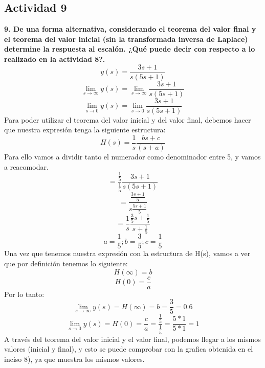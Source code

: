 \subsection{Actividad 9}
\noindent\textbf{9. De una forma alternativa, considerando el teorema del valor final y el teorema del valor inicial (sin la transformada inversa de Laplace) determine la respuesta al escalón. ¿Qué puede decir con respecto a lo realizado en la actividad 8?.}
\[
y(s)=\frac{3s+1}{s(5s+1)}
\]
\[
\lim_{s \to \infty}y(s)=\lim_{s \to \infty}\frac{3s+1}{s(5s+1)}
\]
\[
\lim_{s \to 0}y(s)=\lim_{s \to 0}\frac{3s+1}{s(5s+1)}
\]
Para poder utilizar el teorema del valor inicial y del valor final, debemos hacer que nuestra expresión tenga la siguiente estructura:
\[
H(s)=\frac{1}{s}\frac{bs+c}{(s+a)}
\]
Para ello vamos a dividir tanto el numerador como denominador entre 5, y vamos a reacomodar.
\[
=\frac{\frac{1}{5}}{\frac{1}{5}}\frac{3s+1}{s(5s+1)}
\]
\[
=\frac{\frac{3s+1}{5}}{s{\frac{5s+1}{5}}}
\]
\[
=\frac{1}{s}\frac{\frac{3}{5}s+\frac{1}{5}}{s+\frac{1}{5}}
\]
\[
a=\frac{1}{5};b=\frac{3}{5};c=\frac{1}{5}
\]
Una vez que tenemos nuestra  expresión con la estructura de H(s), vamos a ver que por definición tenemos lo siguiente:
\[
H(\infty)=b
\]
\[
H(0)=\frac{c}{a}
\]
Por lo tanto:
\[
\lim_{s \to \infty}y(s)=H(\infty)=b=\frac{3}{5}=0.6
\]
\[
\lim_{s \to 0}y(s)=H(0)=\frac{c}{a}=\frac{\frac{1}{5}}{\frac{1}{5}}=
\frac{5*1}{5*1}=1
\]
A través del teorema del valor inicial y el valor final, podemos llegar a los mismos valores (inicial y final), y esto se puede comprobar con la grafica obtenida en el inciso 8), ya que muestra los mismos valores.
